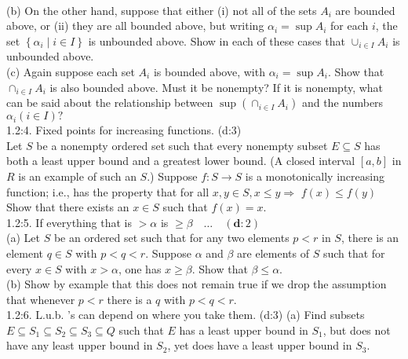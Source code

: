 \documentclass[12pt]{ctexart}
\theoremstyle{definition}
\theoremstyle{plain}
\theoremstyle{remark}
\begin{document}
\\ (b) On the other hand, suppose that either (i) not all of the sets \(A_i\) are bounded above, or (ii) they are all bounded above, but writing \(\alpha_i=\sup A_i\) for each \(i\), the set \(\left\{\alpha_i \mid i \in I\right\}\) is unbounded above. Show in each of these cases that \(\cup_{i \in I} A_i\) is unbounded above.
\\ (c) Again suppose each set \(A_i\) is bounded above, with \(\alpha_i=\sup A_i\). Show that \(\cap _{i \in I} A_i\) is also bounded above. Must it be nonempty? If it is nonempty, what can be said about the relationship between \(\sup \left(\cap_{i \in I} A_i\right)\) and the numbers \(\alpha_i(i \in I) ?\)
\\1.2:4. Fixed points for increasing functions. (d:3)
\\Let \(S\) be a nonempty ordered set such that every nonempty subset \(E \subseteq S\) has both a least upper bound and a greatest lower bound. (A closed interval \([a, b]\) in \(R\) is an example of such an \(S\).) Suppose \(f: S \rightarrow S\) is a monotonically increasing function; i.e., has the property that for all \(x, y \in S, x \leq y \Rightarrow\) \(f(x) \leq f(y)\)
\\Show that there exists an \(x \in S\) such that \(f(x)=x\).
\\1.2:5. If everything that is \(>\alpha\) is \(\geq \beta \quad \ldots \quad(\mathbf{d}: 2)\)
\\(a) Let \(S\) be an ordered set such that for any two elements \(p<r\) in \(S\), there is an element \(q \in S\) with \(p<q<r\). Suppose \(\alpha\) and \(\beta\) are elements of \(S\) such that for every \(x \in S\) with \(x>\alpha\), one has \(x \geq \beta\). Show that \(\beta \leq \alpha\).
\\(b) Show by example that this does not remain true if we drop the assumption that whenever \(p<r\) there is a \(q\) with \(p<q<r\).
\\1.2:6. L.u.b. 's can depend on where you take them. (d:3)
(a) Find subsets \(E \subseteq S_1 \subseteq S_2 \subseteq S_3 \subseteq Q\) such that \(E\) has a least upper bound in \(S_1\), but does not have any least upper bound in \(S_2\), yet does have a least upper bound in \(S_3\). 


\end{document}
